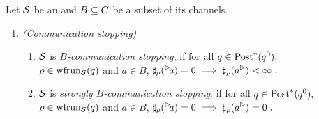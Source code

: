 
\begin{definition}\label{def:rp}
    Let $\S$ be an \AIOTS and $B \subseteq \chan$ be a subset of its channels.
\begin{enumerate}[label=P\arabic*:, ref=(P\arabic*), leftmargin=*,start=5]
        \item\label{def:rp:stopping} \emph{(Communication stopping)}
            \begin{enumerate}[label=\alph*), ref=(P\arabic{enumi}.\alph*), leftmargin=*, itemsep=4pt]
            \item\label{def:rp:bas-stopping}$\S$ is \emph{$B$-communication stopping}, if for all $q\in \post^*(q^0),$ \\$\rho \in \frun{\S}(q)$ and $a \in B$, 
                $\sharp_\rho(\inact{a})=0 \implies \sharp_\rho(\outact{a}) < \infty \;.
            $  
            \item\label{def:rp:str-stopping}$\S$ is \emph{strongly $B$-communication stopping}, if for all $q\in \post^*(q^0),$ $\rho \in \frun{\S}(q)$ and $a \in B$, 
               $ \sharp_\rho(\inact{a})=0 \implies \sharp_\rho(\outact{a})=0\;.
            $
        \end{enumerate}  
\end{enumerate}
\end{definition}


